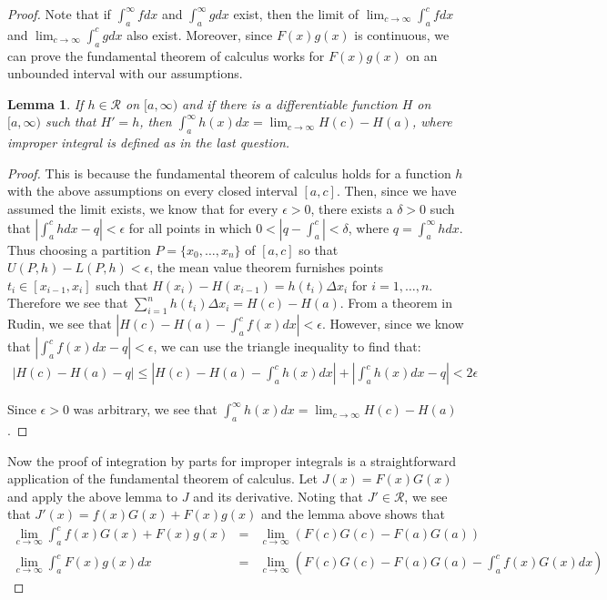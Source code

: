 \documentclass[psamsfonts]{amsart}
\newtheorem{lem}[thm]{Lemma}
\theoremstyle{definition}
\theoremstyle{remark}
\numberwithin{equation}{section}
\begin{document}
\begin{proof}
Note that if $\int_a^\infty f dx$ and $\int_a^\infty g dx$ exist, then the limit of $\lim_{c \to \infty} \int_a^c f dx$ and $\lim_{c \to \infty} \int_a^c g dx$ also exist. Moreover, since $F(x)g(x)$ is continuous, we can prove the fundamental theorem of calculus works for $F(x)g(x)$ on an unbounded interval with our assumptions.

\begin{lem}
If $h \in \mathscr{R}$ on $[a, \infty)$ and if there is a differentiable function $H$ on $[a,\infty)$ such that $H' = h$, then $\int_a^\infty h(x) dx = \lim_{c \to \infty} H(c) - H(a)$, where improper integral is defined as in the last question. 
\end{lem}

\begin{proof}
This is because the fundamental theorem of calculus holds for a function $h$ with the above assumptions on every closed interval $[a,c]$. Then, since we have assumed the limit exists, we know that for every $\epsilon > 0$, there exists a $\delta > 0$ such that $|\int_a^c h dx - q| < \epsilon$ for all points in which $0 < |q - \int_a^c | < \delta$, where $q = \int_a^\infty h dx$. Thus choosing a partition $P = \{x_0, \ldots, x_n \}$ of $[a,c]$ so that $U(P,h) - L(P,h) < \epsilon$, the mean value theorem furnishes points $t_i \in [x_{i-1}, x_i]$ such that $H(x_i) - H(x_{i-1}) = h(t_i) \Delta x_i$ for $i = 1,\ldots,n$. Therefore we see that $\sum_{i=1}^n h(t_i) \Delta x_i = H(c) - H(a)$. From a theorem in Rudin, we see that $|H(c) - H(a) - \int_a^c f(x) dx | < \epsilon$. However, since we know that $|\int_a^c f(x) dx - q | < \epsilon$, we can use the triangle inequality to find that:
\begin{eqnarray}
|H(c) - H(a) - q| \leq \left|H(c) - H(a) - \int_a^c h (x) dx \right| + \left| \int_a^c h(x) dx - q \right| < 2 \epsilon
\end{eqnarray}

Since $\epsilon > 0$ was arbitrary, we see that $\int_a^\infty h(x) dx = \lim_{c \to \infty} H(c) - H(a)$. 
\end{proof}

Now the proof of integration by parts for improper integrals is a straightforward application of the fundamental theorem of calculus. Let $J(x) = F(x)G(x)$ and apply the above lemma to $J$ and its derivative. Noting that $J' \in \mathscr{R}$, we see that $J'(x) = f(x)G(x) + F(x)g(x)$ and the lemma above shows that 
\begin{eqnarray}
\lim_{c \to \infty} \int_a^c f(x)G(x) + F(x)g(x) &=& \lim_{c \to \infty} \left( F(c)G(c) - F(a)G(a) \right) \\
\lim_{c \to \infty} \int_a^c F(x)g(x) dx &=& \lim_{c \to \infty} \left( F(c)G(c) - F(a)G(a) - \int_a^c f(x)G(x) dx \right)
\end{eqnarray}


\end{proof}
\end{document}
